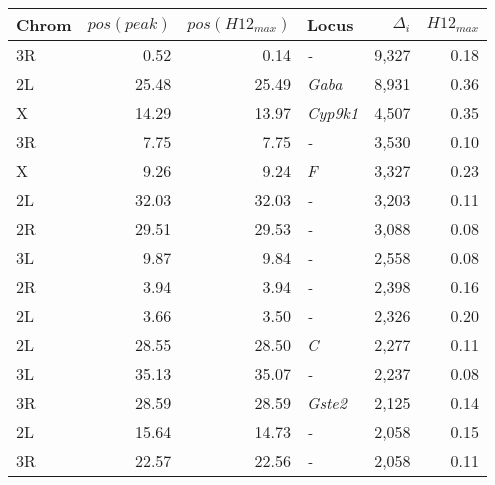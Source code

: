 \begin{tabular}{lrrlrr}
\toprule
Chrom & $pos(peak)$ & $pos(H12_{max})$ &            Locus & $\Delta_{i}$ & $H12_{max}$ \\
\midrule
   3R &        0.52 &             0.14 &       \textit{-} &        9,327 &        0.18 \\
   2L &       25.48 &            25.49 &    \textit{Gaba} &        8,931 &        0.36 \\
    X &       14.29 &            13.97 &  \textit{Cyp9k1} &        4,507 &        0.35 \\
   3R &        7.75 &             7.75 &       \textit{-} &        3,530 &        0.10 \\
    X &        9.26 &             9.24 &       \textit{F} &        3,327 &        0.23 \\
   2L &       32.03 &            32.03 &       \textit{-} &        3,203 &        0.11 \\
   2R &       29.51 &            29.53 &       \textit{-} &        3,088 &        0.08 \\
   3L &        9.87 &             9.84 &       \textit{-} &        2,558 &        0.08 \\
   2R &        3.94 &             3.94 &       \textit{-} &        2,398 &        0.16 \\
   2L &        3.66 &             3.50 &       \textit{-} &        2,326 &        0.20 \\
   2L &       28.55 &            28.50 &       \textit{C} &        2,277 &        0.11 \\
   3L &       35.13 &            35.07 &       \textit{-} &        2,237 &        0.08 \\
   3R &       28.59 &            28.59 &   \textit{Gste2} &        2,125 &        0.14 \\
   2L &       15.64 &            14.73 &       \textit{-} &        2,058 &        0.15 \\
   3R &       22.57 &            22.56 &       \textit{-} &        2,058 &        0.11 \\
\bottomrule
\end{tabular}
